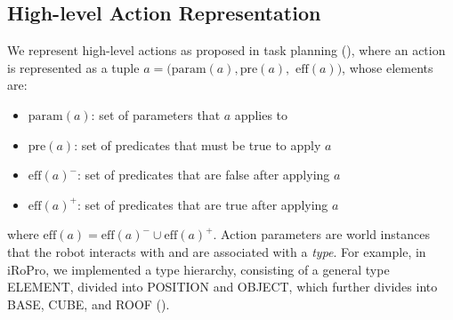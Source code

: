 \subsection{High-level Action Representation}
\label{sec:highlevel}
We represent high-level actions as proposed in task planning (), where an action is represented as a tuple $a = (\text{param}(a), \text{pre}(a),$ $\text{eff}(a))$, whose elements are:
\begin{itemize}
\item $\text{param}(a)$: set of parameters that $a$ applies to
\item $\text{pre}(a)$: set of predicates that must be true to apply $a$
\item $\text{eff}(a)^{-}$: set of predicates that are false after applying $a$
\item $\text{eff}(a)^{+}$: set of predicates that are true after applying $a$
\end{itemize}
where $\text{eff}(a) = \text{eff}(a)^{-} \cup \text{eff}(a)^{+}$. 
Action parameters are world instances that the robot interacts with and are associated with a \textit{type}.
For example, in iRoPro, we implemented a type hierarchy, consisting of a general type ELEMENT, divided into POSITION and OBJECT, which further divides into BASE, CUBE, and ROOF ().

